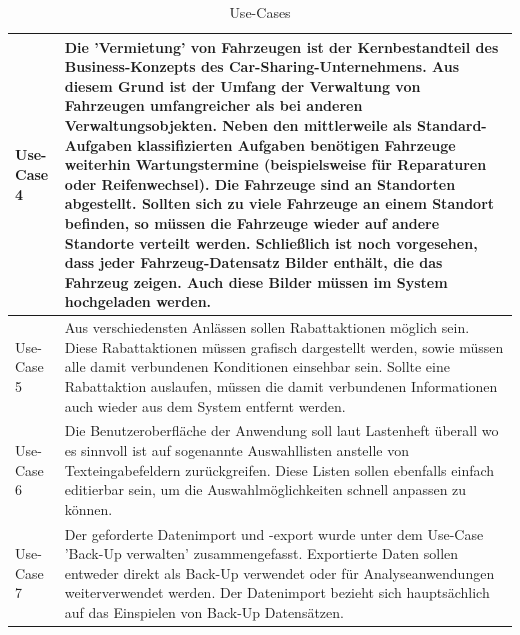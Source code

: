\begin{table}[ht]

    \begin{onehalfspace}

    \begin{tabular}{l | p{12.5cm}}
        \hline
        Use-Case 4 & Die 'Vermietung' von Fahrzeugen ist der Kernbestandteil des Business-Konzepts des Car-Sharing-Unternehmens. Aus diesem Grund ist der Umfang der Verwaltung von Fahrzeugen umfangreicher als bei anderen Verwaltungsobjekten. Neben den mittlerweile als Standard-Aufgaben klassifizierten Aufgaben benötigen Fahrzeuge weiterhin Wartungstermine (beispielsweise für Reparaturen oder Reifenwechsel). Die Fahrzeuge sind an Standorten abgestellt. Sollten sich zu viele Fahrzeuge an einem Standort befinden, so müssen die Fahrzeuge wieder auf andere Standorte verteilt werden. Schließlich ist noch vorgesehen, dass jeder Fahrzeug-Datensatz Bilder enthält, die das Fahrzeug zeigen. Auch diese Bilder müssen im System hochgeladen werden. \\
        \hline
        Use-Case 5 & Aus verschiedensten Anlässen sollen Rabattaktionen möglich sein. Diese Rabattaktionen müssen grafisch dargestellt werden, sowie müssen alle damit verbundenen Konditionen einsehbar sein. Sollte eine Rabattaktion auslaufen, müssen die damit verbundenen Informationen auch wieder aus dem System entfernt werden.\\
        \hline
        Use-Case 6 & Die Benutzeroberfläche der Anwendung soll laut Lastenheft überall wo es sinnvoll ist auf sogenannte Auswahllisten anstelle von Texteingabefeldern zurückgreifen. Diese Listen sollen ebenfalls einfach editierbar sein, um die Auswahlmöglichkeiten schnell anpassen zu können.\\
        \hline
        Use-Case 7 & Der geforderte Datenimport und -export wurde unter dem Use-Case 'Back-Up verwalten' zusammengefasst. Exportierte Daten sollen entweder direkt als Back-Up verwendet oder für Analyseanwendungen weiterverwendet werden. Der Datenimport bezieht sich hauptsächlich auf das Einspielen von Back-Up Datensätzen.\\
        \hline
    \end{tabular}
    \caption{Use-Cases}
    \label{tbl:usecases2}

    \end{onehalfspace}
\end{table}

\clearpage

